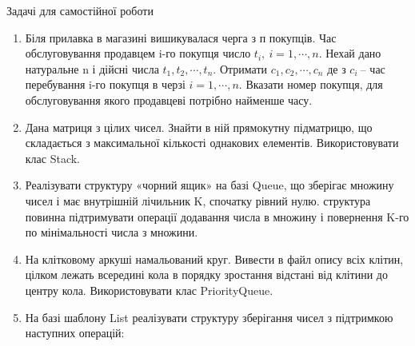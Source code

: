 \documentclass[]{article}
\begin{document}
Задачі для самостійної роботи

\begin{enumerate}
\def\labelenumi{\arabic{enumi})}
\item
  Біля прилавка в магазині вишикувалася черга з п покупців. Час
  обслуговування продавцем i-го покупця число
  \(t_{i},\ i = 1,\cdots,n\). Нехай дано натуральне n і дійсні числа
  \(t_{1},t_{2},\cdots,t_{n}\). Отримати \(c_{1},c_{2},\cdots,c_{n}\) де
  з \(c_{i}\ \)-- час перебування i-го покупця в черзі
  \(i = 1,\cdots,n\). Вказати номер покупця, для обслуговування якого
  продавцеві потрібно найменше часу.
\item
  Дана матриця з цілих чисел. Знайти в ній прямокутну підматрицю, що
  складається з максимальної кількості однакових елементів.
  Використовувати клас Stack.
\item
  Реалізувати структуру «чорний ящик» на базі Queue, що зберігає множину
  чисел і має внутрішній лічильник K, спочатку рівний нулю. структура
  повинна підтримувати операції додавання числа в множину і повернення
  K-го по мінімальності числа з множини.
\item
  На клітковому аркуші намальований круг. Вивести в файл опису всіх
  клітин, цілком лежать всередині кола в порядку зростання відстані від
  клітини до центру кола. Використовувати клас PriorityQueue.
\item
  На базі шаблону List реалізувати структуру зберігання чисел з
  підтримкою наступних операцій:


\end{enumerate}
\end{document}
